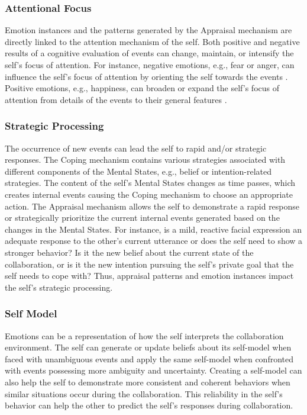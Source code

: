 \documentclass[12pt]{report}
\begin{document}
\subsubsection{Attentional Focus} Emotion instances and the patterns generated
by the Appraisal mechanism are directly linked to the attention mechanism of the
self. Both positive and negative results of a cognitive evaluation of events
can change, maintain, or intensify the self's focus of attention. For instance,
negative emotions, e.g., fear or anger, can influence the self's focus of
attention by orienting the self towards the events
\cite{faucher:fear-attention}. Positive emotions, e.g., happiness, can broaden
or expand the self's focus of attention from details of the events to their
general features \cite{fredrickson:positive-emotion-attention}.

\subsubsection{Strategic Processing} The occurrence of new events can lead the
self to rapid and/or strategic responses. The Coping mechanism contains various
strategies associated with different components of the Mental States, e.g.,
belief or intention-related strategies. The content of the self's Mental States
changes as time passes, which creates internal events causing the Coping
mechanism to choose an appropriate action. The Appraisal mechanism allows the
self to demonstrate a rapid response or strategically prioritize the current
internal events generated based on the changes in the Mental States. For
instance, is a mild, reactive facial expression an adequate response to the
other's current utterance or does the self need to show a stronger behavior? Is
it the new belief about the current state of the collaboration, or is it the new
intention pursuing the self's private goal that the self needs to cope with?
Thus, appraisal patterns and emotion instances impact the self's strategic
processing.

\subsubsection{Self Model} Emotions can be a representation of how the self
interprets the collaboration environment. The self can generate or update
beliefs about its self-model when faced with unambiguous events and apply the
same self-model when confronted with events possessing more ambiguity and
uncertainty. Creating a self-model can also help the self to demonstrate more
consistent and coherent behaviors when similar situations occur during the
collaboration. This reliability in the self's behavior can help the other to
predict the self's responses during collaboration.
\end{document}
